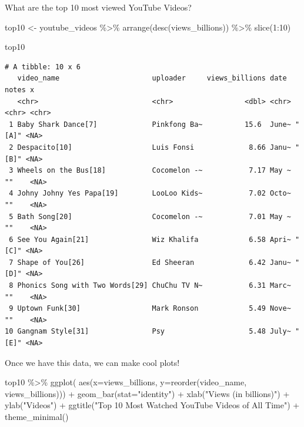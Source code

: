 \documentclass[
  letterpaper,
  DIV=11,
  numbers=noendperiod]{scrartcl}
\newenvironment{Shaded}{\begin{snugshade}}{\end{snugshade}}
\newcommand{\AttributeTok}[1]{\textcolor[rgb]{0.40,0.45,0.13}{#1}}
\newcommand{\DecValTok}[1]{\textcolor[rgb]{0.68,0.00,0.00}{#1}}
\newcommand{\FunctionTok}[1]{\textcolor[rgb]{0.28,0.35,0.67}{#1}}
\newcommand{\NormalTok}[1]{\textcolor[rgb]{0.00,0.23,0.31}{#1}}
\newcommand{\OtherTok}[1]{\textcolor[rgb]{0.00,0.23,0.31}{#1}}
\newcommand{\SpecialCharTok}[1]{\textcolor[rgb]{0.37,0.37,0.37}{#1}}
\newcommand{\StringTok}[1]{\textcolor[rgb]{0.13,0.47,0.30}{#1}}
\begin{document}
What are the top 10 most viewed YouTube Videos?

\begin{Shaded}
\begin{Highlighting}[]
\NormalTok{top10 }\OtherTok{\textless{}{-}}\NormalTok{ youtube\_videos }\SpecialCharTok{\%\textgreater{}\%}
  \FunctionTok{arrange}\NormalTok{(}\FunctionTok{desc}\NormalTok{(views\_billions)) }\SpecialCharTok{\%\textgreater{}\%}
  \FunctionTok{slice}\NormalTok{(}\DecValTok{1}\SpecialCharTok{:}\DecValTok{10}\NormalTok{)}

\NormalTok{top10}
\end{Highlighting}
\end{Shaded}

\begin{verbatim}
# A tibble: 10 x 6
   video_name                      uploader     views_billions date  notes x    
   <chr>                           <chr>                 <dbl> <chr> <chr> <chr>
 1 Baby Shark Dance[7]             Pinkfong Ba~          15.6  June~ "[A]" <NA> 
 2 Despacito[10]                   Luis Fonsi             8.66 Janu~ "[B]" <NA> 
 3 Wheels on the Bus[18]           Cocomelon -~           7.17 May ~ ""    <NA> 
 4 Johny Johny Yes Papa[19]        LooLoo Kids~           7.02 Octo~ ""    <NA> 
 5 Bath Song[20]                   Cocomelon -~           7.01 May ~ ""    <NA> 
 6 See You Again[21]               Wiz Khalifa            6.58 Apri~ "[C]" <NA> 
 7 Shape of You[26]                Ed Sheeran             6.42 Janu~ "[D]" <NA> 
 8 Phonics Song with Two Words[29] ChuChu TV N~           6.31 Marc~ ""    <NA> 
 9 Uptown Funk[30]                 Mark Ronson            5.49 Nove~ ""    <NA> 
10 Gangnam Style[31]               Psy                    5.48 July~ "[E]" <NA> 
\end{verbatim}

Once we have this data, we can make cool plots!

\begin{Shaded}
\begin{Highlighting}[]
\NormalTok{top10 }\SpecialCharTok{\%\textgreater{}\%} 
  \FunctionTok{ggplot}\NormalTok{( }\FunctionTok{aes}\NormalTok{(}\AttributeTok{x=}\NormalTok{views\_billions, }\AttributeTok{y=}\FunctionTok{reorder}\NormalTok{(video\_name, views\_billions))) }\SpecialCharTok{+}
    \FunctionTok{geom\_bar}\NormalTok{(}\AttributeTok{stat=}\StringTok{"identity"}\NormalTok{) }\SpecialCharTok{+}
    \FunctionTok{xlab}\NormalTok{(}\StringTok{"Views (in billions)"}\NormalTok{) }\SpecialCharTok{+}
    \FunctionTok{ylab}\NormalTok{(}\StringTok{"Videos"}\NormalTok{) }\SpecialCharTok{+}
    \FunctionTok{ggtitle}\NormalTok{(}\StringTok{"Top 10 Most Watched YouTube Videos of All Time"}\NormalTok{) }\SpecialCharTok{+}
    \FunctionTok{theme\_minimal}\NormalTok{()}
\end{Highlighting}
\end{Shaded}
\end{document}
